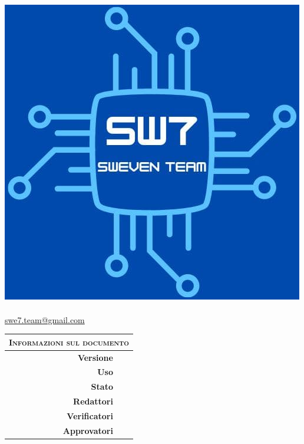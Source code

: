 \documentclass[12pt, a4paper,table]{article}
\title{\textsc{\docNome} \\ \textsc{\docNomeProgetto}}
\author{}
\date{}
\begin{document}
	\maketitle
	\vspace{-3em}
	\begin{center}
	\includegraphics[scale=0.50]{images/logo.jpg} \\
	\vspace{2em}
	\huge \textsc{\docNomeTeam}\\
	\normalsize \href{mailto:swe7.team@gmail.com}{swe7.team@gmail.com}\\
	\vspace{2em}
	\begin{tabular}{r|l}
		\multicolumn{2}{c}{ \textsc{Informazioni sul documento} } \\
		\hline
		\textbf{Versione}     & \docVersione\\
		\textbf{Uso}          & \docUso\\
		\textbf{Stato}        & \docStatus\\
		\textbf{Redattori}    & \docRedattori\\
		\textbf{Verificatori} & \docVerificatori\\
		\textbf{Approvatori} & \docApprovazione\\
	\end{tabular}
	\end{center}
	\thispagestyle{empty}   
	\newpage
\end{document}
